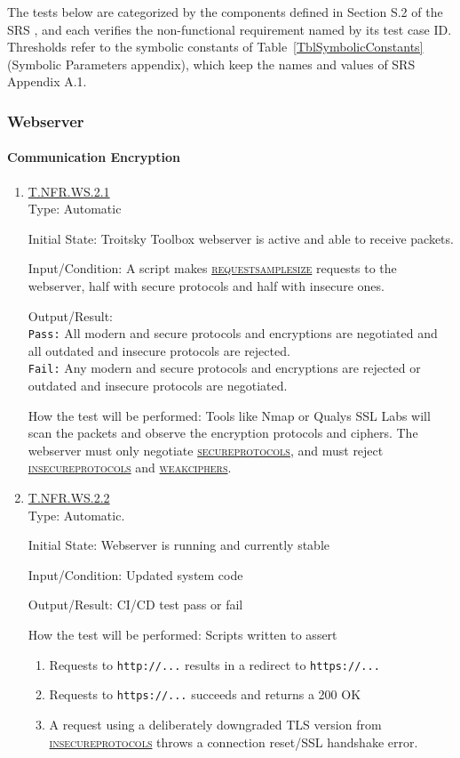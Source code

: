 \documentclass[12pt, titlepage]{article}
\newcommand{\testdef}[1]{\leavevmode\hypertarget{test:#1}{}\hyperlink{trace:#1}{#1}}
\DeclareRobustCommand{\cname}[1]{{\renewcommand{\_}{\textunderscore\allowbreak}\textsc{#1}}}
\newcommand{\constfirst}[1]{\leavevmode\hypertarget{constfirst:\detokenize{#1}}{}\hyperlink{const:\detokenize{#1}}{\cname{#1}}}
\newcommand{\const}[1]{\hyperlink{const:\detokenize{#1}}{\cname{#1}}}
\begin{document}
The tests below are categorized by the components defined in Section S.2 of the
SRS \citep{TroitskySRS}, and each verifies the non-functional requirement named
by its test case ID. Thresholds refer to the symbolic constants of
Table~\ref{TblSymbolicConstants} (Symbolic Parameters appendix), which keep the
names and values of SRS Appendix A.1.

\subsubsection{Webserver}
\paragraph{Communication Encryption}

\begin{enumerate}

\item \testdef{T.NFR.WS.2.1}\\
Type: Automatic
					
Initial State: Troitsky Toolbox webserver is active and able to receive packets.
					
Input/Condition: A script makes \constfirst{request\_sample\_size} requests to the webserver, half with secure protocols and half with insecure ones.
					
Output/Result: \\
\texttt{Pass:} All modern and secure protocols and encryptions are negotiated and all outdated and insecure protocols are rejected.\\
\texttt{Fail:} Any modern and secure protocols and encryptions are rejected or outdated and insecure protocols are negotiated.
					
How the test will be performed: Tools like Nmap or Qualys SSL Labs will scan the packets and observe the encryption protocols and ciphers. The webserver must only negotiate \constfirst{secure\_protocols}, and must reject \constfirst{insecure\_protocols} and \constfirst{weak\_ciphers}.
					
\item \testdef{T.NFR.WS.2.2}\\
Type: Automatic.
					
Initial State: Webserver is running and currently stable
					
Input/Condition: Updated system code
					
Output/Result: CI/CD test pass or fail
					
How the test will be performed: Scripts written to assert
\begin{enumerate}
  \item Requests to \texttt{http://...} results in a redirect to \texttt{https://...}
  \item Requests to \texttt{https://...} succeeds and returns a 200 OK
  \item A request using a deliberately downgraded TLS version from \const{insecure\_protocols} throws a connection reset/SSL handshake error.
\end{enumerate}


\end{enumerate}
\end{document}
